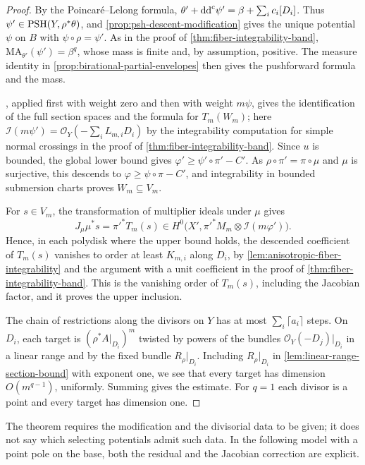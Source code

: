 \begin{proof}
By the Poincar\'e--Lelong formula, $\theta'+\mathrm{dd}^{\mathrm{c}}\psi'=\beta+\sum_i c_i[D_i]$. Thus $\psi'\in\mathrm{PSH}(Y,\rho^*\theta)$, and \cref{prop:psh-descent-modification} gives the unique potential $\psi$ on $B$ with $\psi\circ\rho=\psi'$. As in the proof of \cref{thm:fiber-integrability-band}, $\mathrm{MA}_{\theta'}(\psi')=\beta^q$, whose mass is finite and, by assumption, positive. The measure identity in \cref{prop:birational-partial-envelopes} then gives the pushforward formula and the mass.

, applied first with weight zero and then with weight $m\psi$, gives the identification of the full section spaces and the formula for $T_m(W_m)$; here $\mathcal I(m\psi')=\mathcal O_Y(-\sum_iL_{m,i}D_i)$ by the integrability computation for simple normal crossings in the proof of \cref{thm:fiber-integrability-band}. Since $u$ is bounded, the global lower bound gives $\varphi'\geq\psi'\circ\pi'-C'$. As $\rho\circ\pi'=\pi\circ\mu$ and $\mu$ is surjective, this descends to $\varphi\geq\psi\circ\pi-C'$, and integrability in bounded submersion charts proves $W_m\subseteq V_m$.

For $s\in V_m$, the transformation of multiplier ideals under $\mu$ gives
\[
 J_\mu\mu^*s=\pi'^*T_m(s)
 \in H^0\bigl(X',\pi'^*M_m\otimes\mathcal I(m\varphi')\bigr).
\]
Hence, in each polydisk where the upper bound holds, the descended coefficient of $T_m(s)$ vanishes to order at least $K_{m,i}$ along $D_i$, by \cref{lem:anisotropic-fiber-integrability} and the argument with a unit coefficient in the proof of \cref{thm:fiber-integrability-band}. This is the vanishing order of $T_m(s)$, including the Jacobian factor, and it proves the upper inclusion.

The chain of restrictions along the divisors on $Y$ has at most $\sum_i\lceil a_i\rceil$ steps. On $D_i$, each target is $(\rho^*A|_{D_i})^m$ twisted by powers of the bundles $\mathcal O_Y(-D_j)|_{D_i}$ in a linear range and by the fixed bundle $R_\rho|_{D_i}$. Including $R_\rho|_{D_i}$ in \cref{lem:linear-range-section-bound} with exponent one, we see that every target has dimension $O(m^{q-1})$, uniformly. Summing gives the estimate. For $q=1$ each divisor is a point and every target has dimension one.
\end{proof}

The theorem requires the modification and the divisorial data to be given; it does not say which selecting potentials admit such data. In the following model with a point pole on the base, both the residual and the Jacobian correction are explicit.

